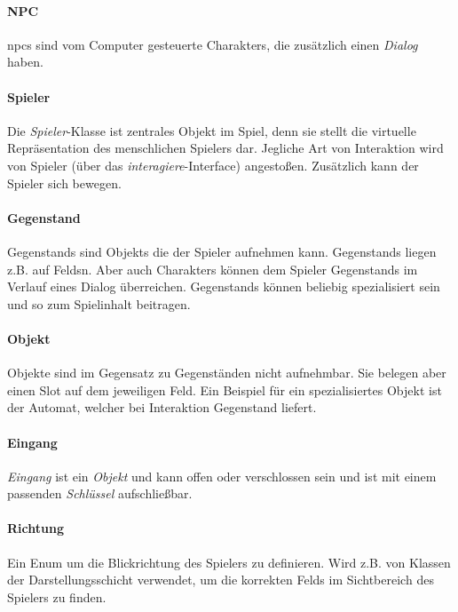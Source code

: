 \paragraph{NPC}
\gls{npcs} sind vom Computer gesteuerte \glspl{Charakter}, die zusätzlich einen \textit{Dialog} haben.
	
\paragraph{Spieler}
Die \textit{Spieler}-Klasse ist zentrales Objekt im \gls{Spiel}, denn sie stellt die virtuelle Repräsentation
des menschlichen \gls{Spieler}s dar. Jegliche Art von Interaktion wird von \gls{Spieler} (über das
\textit{interagiere}-Interface) angestoßen. Zusätzlich kann der \gls{Spieler} sich bewegen.

\paragraph{Gegenstand}
\glspl{Gegenstand} sind \glspl{Objekt} die der \gls{Spieler} aufnehmen kann. \glspl{Gegenstand} liegen z.B. auf
\glspl{Feld}n. Aber auch \glspl{Charakter} können dem \gls{Spieler} \glspl{Gegenstand} im Verlauf eines 
\gls{Dialog} überreichen. \glspl{Gegenstand} können beliebig spezialisiert sein und so zum Spielinhalt
beitragen.

\paragraph{Objekt}
Objekte sind im Gegensatz zu Gegenständen nicht aufnehmbar. Sie belegen aber einen Slot auf dem jeweiligen
Feld. Ein Beispiel für ein spezialisiertes Objekt ist der Automat, welcher bei Interaktion Gegenstand liefert.

\paragraph{Eingang}
\textit{Eingang} ist ein \textit{Objekt} und kann offen oder verschlossen sein und ist mit einem passenden
\textit{Schlüssel} aufschließbar.

\paragraph{Richtung}
Ein Enum um die \gls{Blickrichtung} des \gls{Spieler}s zu definieren. Wird z.B. von Klassen der
Darstellungsschicht verwendet, um die korrekten \glspl{Feld} im \gls{Sichtbereich} des \gls{Spieler}s
zu finden.

